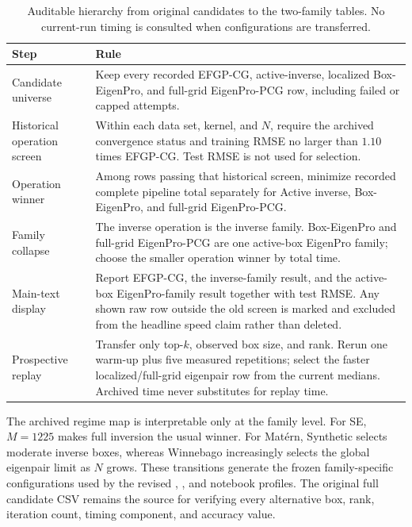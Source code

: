 \begin{table}[H]
\centering
\footnotesize
\caption{Auditable hierarchy from original candidates to the two-family
tables.  No current-run timing is consulted when configurations are
transferred.}
\label{tab:archived-selection-hierarchy}
\begin{tabular}{@{}p{}p{}@{}}
\toprule
Step & Rule \\
\midrule
Candidate universe
& Keep every recorded EFGP-CG, active-inverse, localized Box-EigenPro, and
full-grid EigenPro-PCG row, including failed or capped attempts. \\
Historical operation screen
& Within each data set, kernel, and $N$, require the archived convergence
status and training RMSE no larger than $1.10$ times EFGP-CG.  Test RMSE is
not used for selection. \\
Operation winner
& Among rows passing that historical screen, minimize recorded complete
pipeline total separately for Active inverse, Box-EigenPro, and full-grid
EigenPro-PCG. \\
Family collapse
& The inverse operation is the inverse family.  Box-EigenPro and full-grid
EigenPro-PCG are one active-box EigenPro family; choose the smaller operation
winner by total time. \\
Main-text display
& Report EFGP-CG, the inverse-family result, and the active-box EigenPro-family
result together with test RMSE.  Any shown raw row outside the old screen is
marked and excluded from the headline speed claim rather than deleted. \\
Prospective replay
& Transfer only top-$k$, observed box size, and rank.  Rerun one warm-up plus
five measured repetitions; select the faster localized/full-grid eigenpair
row from the current medians.  Archived time never substitutes for replay
time. \\
\bottomrule
\end{tabular}
\end{table}

The archived regime map is interpretable only at the family level.  For SE,
$M=1225$ makes full inversion the usual winner.  For Mat\'ern, Synthetic
selects moderate inverse boxes, whereas Winnebago increasingly selects the
global eigenpair limit as $N$ grows.  These transitions generate the frozen
family-specific configurations used by the revised
,
, and
 notebook profiles.  The original full candidate
CSV remains the source for verifying every alternative box, rank, iteration
count, timing component, and accuracy value.

